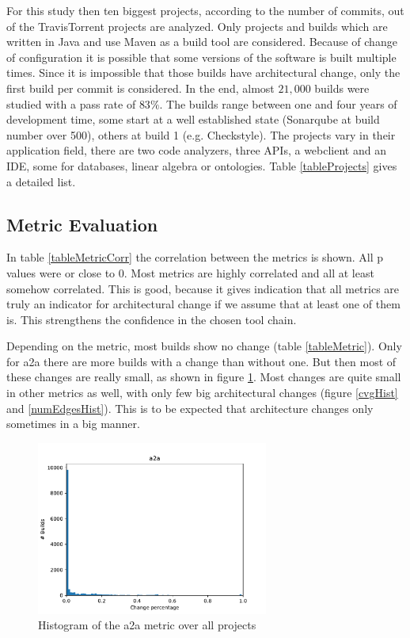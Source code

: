 \documentclass[conference]{IEEEtran}
\begin{document}
For this study then ten biggest projects, according to the number of commits, out of the TravisTorrent projects are analyzed. Only projects and builds which are written in Java and use Maven as a build tool are considered. Because of change of configuration it is possible that some versions of the software is built multiple times. Since it is impossible that those builds have architectural change, only the first build per commit is considered. In the end, almost $21,000$ builds were studied with a pass rate of $83\%$. The builds range between one and four years of development time, some start at a well established state (Sonarqube at build number over 500), others at build 1 (e.g. Checkstyle). The projects vary in their application field, there are two code analyzers, three APIs, a webclient and an IDE, some for databases, linear algebra or ontologies. Table \ref{tableProjects} gives a detailed list.

\subsection{Metric Evaluation}




In table \ref{tableMetricCorr} the correlation between the metrics is shown. All p values were or close to 0. Most metrics are highly correlated and all at least somehow correlated. This is good, because it gives indication that all metrics are truly an indicator for architectural change if we assume that at least one of them is. This strengthens the confidence in the chosen tool chain. 

Depending on the metric, most builds show no change (table \ref{tableMetric}). Only for a2a there are more builds with a change than without one. But then most of these changes are really small, as shown in figure \ref{a2aHist}. Most changes are quite small in other metrics as well, with only few big architectural changes (figure \ref{cvgHist} and \ref{numEdgesHist}). This is to be expected that architecture changes only sometimes in a big manner.

\begin{figure}
	\centering
	\includegraphics[width=3in]{assets/a2a.pdf}
	\caption{Histogram of the a2a metric over all projects}
	\label{a2aHist}
\end{figure}
\end{document}
